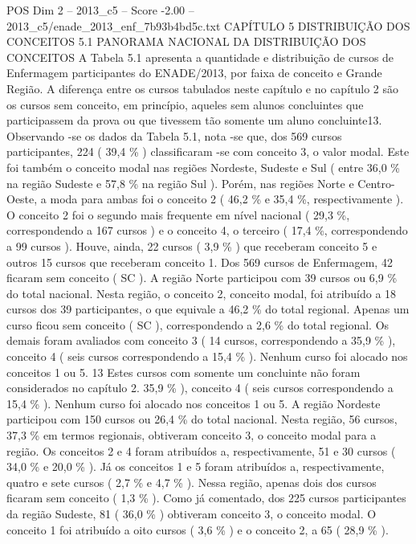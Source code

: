 \begin{textsample}{POS Dim 2 – 2013\_c5 – Score -2.00 – 2013\_c5/enade\_2013\_enf\_7b93b4bd5c.txt}  \label{ex:f2_pos_373}
CAPÍTULO 5 DISTRIBUIÇÃO DOS CONCEITOS 5.1 PANORAMA NACIONAL DA DISTRIBUIÇÃO DOS CONCEITOS A Tabela 5.1 apresenta a quantidade e distribuição de cursos de Enfermagem participantes do ENADE/2013, por faixa de conceito e Grande Região.
A diferença entre os cursos tabulados neste capítulo e no capítulo 2 são os cursos sem conceito, em princípio, aqueles sem alunos concluintes que participassem da prova ou que tivessem tão somente um aluno concluinte13.
Observando -se os dados da Tabela 5.1, nota -se que, dos 569 cursos participantes, 224 ( 39,4 \% ) classificaram -se com conceito 3, o valor modal.
Este foi também o conceito modal nas regiões Nordeste, Sudeste e Sul ( entre 36,0 \% na região Sudeste e 57,8 \% na região Sul ).
Porém, nas regiões Norte e Centro-Oeste, a moda para ambas foi o conceito 2 ( 46,2 \% e 35,4 \%, respectivamente ).
O conceito 2 foi o segundo mais frequente em nível nacional ( 29,3 \%, correspondendo a 167 cursos ) e o conceito 4, o terceiro ( 17,4 \%, correspondendo a 99 cursos ).
Houve, ainda, 22 cursos ( 3,9 \% ) que receberam conceito 5 e outros 15 cursos que receberam conceito 1.
Dos 569 cursos de Enfermagem, 42 ficaram sem conceito ( SC ).
A região Norte participou com 39 cursos ou 6,9 \% do total nacional.
Nesta região, o conceito 2, conceito modal, foi atribuído a 18 cursos dos 39 participantes, o que equivale a 46,2 \% do total regional.
Apenas um curso ficou sem conceito ( SC ), correspondendo a 2,6 \% do total regional.
Os demais foram avaliados com conceito 3 ( 14 cursos, correspondendo a 35,9 \% ), conceito 4 ( seis cursos correspondendo a 15,4 \% ).
Nenhum curso foi alocado nos conceitos 1 ou 5. 13 Estes cursos com somente um concluinte não foram considerados no capítulo 2. 35,9 \% ), conceito 4 ( seis cursos correspondendo a 15,4 \% ).
Nenhum curso foi alocado nos conceitos 1 ou 5.
A região Nordeste participou com 150 cursos ou 26,4 \% do total nacional.
Nesta região, 56 cursos, 37,3 \% em termos regionais, obtiveram conceito 3, o conceito modal para a região.
Os conceitos 2 e 4 foram atribuídos a, respectivamente, 51 e 30 cursos ( 34,0 \% e 20,0 \% ).
Já os conceitos 1 e 5 foram atribuídos a, respectivamente, quatro e sete cursos ( 2,7 \% e 4,7 \% ).
Nessa região, apenas dois dos cursos ficaram sem conceito ( 1,3 \% ).
Como já comentado, dos 225 cursos participantes da região Sudeste, 81 ( 36,0 \% ) obtiveram conceito 3, o conceito modal.
O conceito 1 foi atribuído a oito cursos ( 3,6 \% ) e o conceito 2, a 65 ( 28,9 \% ).

\end{textsample}
